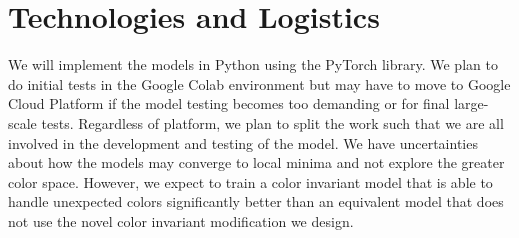 \documentclass[10pt, a4paper]{article}
\begin{document}
\section{Technologies and Logistics}
We will implement the models in Python using the PyTorch library. We plan to do initial tests in the Google Colab environment but may have to move to Google Cloud Platform if the model testing becomes too demanding or for final large-scale tests. Regardless of platform, we plan to split the work such that we are all involved in the development and testing of the model. We have uncertainties about how the models may converge to local minima and not explore the greater color space. However, we expect to train a color invariant model that is able to handle unexpected colors significantly better than an equivalent model that does not use the novel color invariant modification we design.
\newpage


\end{document}
